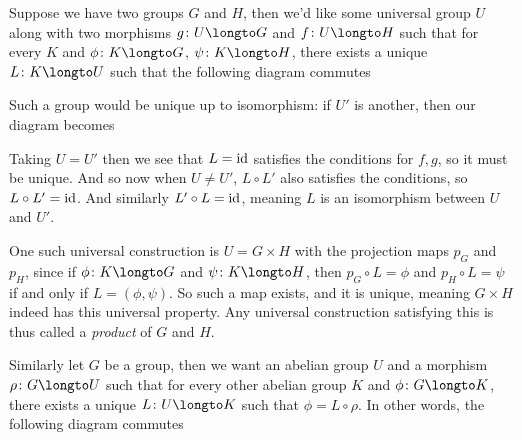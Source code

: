 Suppose we have two groups $G$ and $H$, then we'd like some universal group $U$ along with two morphisms $g\colon U\longto G$ and $f\colon U\longto H$ such that for every $K$ and $\phi\colon K\longto G$,
$\psi\colon K\longto H$, there exists a unique $L\colon K\longto U$ such that the following diagram commutes

\centerline{\def\diagcolwidth{1cm}\def\diagrowheight{.75cm}}

Such a group would be unique up to isomorphism: if $U'$ is another, then our diagram becomes

\centerline{\def\diagcolwidth{1cm}\def\diagrowheight{.75cm}}

Taking $U=U'$ then we see that $L={\rm id}$ satisfies the conditions for $f,g$, so it must be unique.
And so now when $U\neq U'$, $L\circ L'$ also satisfies the conditions, so $L\circ L'={\rm id}$.
And similarly $L'\circ L={\rm id}$, meaning $L$ is an isomorphism between $U$ and $U'$.

One such universal construction is $U=G\times H$ with the projection maps $p_G$ and $p_H$, since if $\phi\colon K\longto G$ and $\psi\colon K\longto H$, then $p_G\circ L=\phi$ and $p_H\circ L=\psi$ if and
only if $L=(\phi,\psi)$.
So such a map exists, and it is unique, meaning $G\times H$ indeed has this universal property.
Any universal construction satisfying this is thus called a {\it product} of $G$ and $H$.

\medskip
Similarly let $G$ be a group, then we want an abelian group $U$ and a morphism $\rho\colon G\longto U$ such that for every other abelian group $K$ and $\phi\colon G\longto K$, there exists a unique
$L\colon U\longto K$ such that $\phi=L\circ\rho$.
In other words, the following diagram commutes

